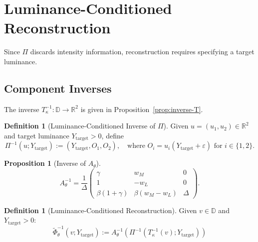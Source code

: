 \documentclass[11pt]{article}
\theoremstyle{plain}
\newtheorem{proposition}[theorem]{Proposition}
\theoremstyle{definition}
\newtheorem{definition}[theorem]{Definition}
\theoremstyle{remark}
\newcommand{\R}{\mathbb{R}}
\newcommand{\D}{\mathbb{D}}
\begin{document}
\section{Luminance-Conditioned Reconstruction}
\label{sec:inverse}

Since $\Pi$ discards intensity information, reconstruction requires specifying a target luminance.

\subsection{Component Inverses}

The inverse $T_\kappa^{-1}: \D \to \R^2$ is given in Proposition~\ref{prop:inverse-T}.

\begin{definition}[Luminance-Conditioned Inverse of $\Pi$]
\label{def:inverse-Pi}
Given $u = (u_1, u_2) \in \R^2$ and target luminance $Y_{\mathrm{target}} > 0$, define
\begin{equation}
\Pi^{-1}(u; Y_{\mathrm{target}}) := (Y_{\mathrm{target}}, O_1, O_2), \quad \text{where } O_i = u_i(Y_{\mathrm{target}} + \varepsilon) \text{ for } i \in \{1, 2\}.
\end{equation}
\end{definition}

\begin{proposition}[Inverse of $A_\theta$]
\label{prop:inverse-A}
\begin{equation}
A_\theta^{-1} = \frac{1}{\Delta} \begin{pmatrix}
\gamma & w_M & 0 \\
1 & -w_L & 0 \\
\beta(1 + \gamma) & \beta(w_M - w_L) & \Delta
\end{pmatrix}.
\end{equation}
\end{proposition}

\begin{definition}[Luminance-Conditioned Reconstruction]
\label{def:reconstruction}
Given $v \in \D$ and $Y_{\mathrm{target}} > 0$:
\begin{equation}
\boxed{
\widetilde{\Phi}_\theta^{-1}(v; Y_{\mathrm{target}}) := A_\theta^{-1} \left( \Pi^{-1}(T_\kappa^{-1}(v); Y_{\mathrm{target}}) \right)
}
\end{equation}
\end{definition}
\end{document}
